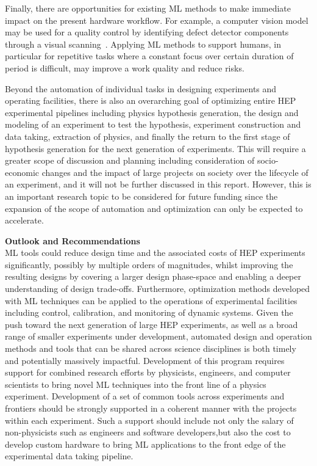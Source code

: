 \documentclass[submission,Phys]{SciPost}
\begin{document}
Finally, there are opportunities for existing ML methods to make immediate impact on the present hardware workflow. For example, a computer vision model may be used for a quality control by identifying defect detector components through a visual scanning~\cite{Akchurin:2022apq}. Applying ML methods to support humans, in particular for repetitive tasks where a constant focus over certain duration of period is difficult, may improve a work quality and reduce risks.

Beyond the automation of individual tasks in designing experiments and operating facilities, there is also an overarching goal of optimizing entire HEP experimental pipelines including physics hypothesis generation, the design and modeling of an experiment to test the hypothesis, experiment construction and data taking, extraction of physics, and finally the return to the first stage of hypothesis generation for the next generation of experiments. This will require a greater scope of discussion and planning including consideration of socio-economic changes and the impact of large projects on society over the lifecycle of an experiment, and it will not be further discussed in this report. However, this is an important research topic to be considered for future funding since the expansion of the scope of automation and optimization can only be expected to accelerate. 

{\bf Outlook and Recommendations}\\
ML tools could reduce design time and the associated costs of HEP experiments significantly, possibly by multiple orders of magnitudes, whilst improving the resulting designs by covering a larger design phase-space and enabling a deeper understanding of design trade-offs. Furthermore, optimization methods developed with ML techniques can be applied to the operations of experimental facilities including control, calibration, and monitoring of dynamic systems. Given the push toward the next generation of large HEP experiments, as well as a broad range of smaller experiments under development, automated design and operation methods and tools that can be shared across science disciplines is both timely and potentially massively impactful. Development of this program requires support for combined research efforts by physicists, engineers, and computer scientists to bring novel ML techniques into the front line of a physics experiment. Development of a set of common tools across experiments and frontiers should be strongly supported in a coherent manner with the projects within each experiment. Such a support should include not only the salary of non-physicists such as engineers and software developers,but also the cost to develop custom hardware to bring ML applications to the front edge of the experimental data taking pipeline.
\end{document}
